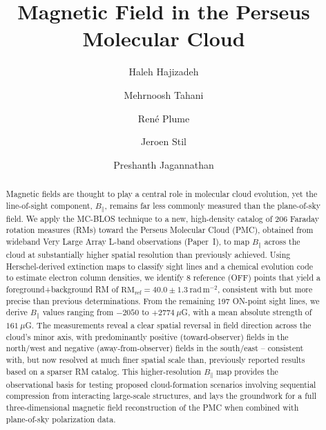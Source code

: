 \documentclass[twocolumn]{aastex631}
\begin{document}
\title{Magnetic Field in the Perseus Molecular Cloud}


\author{Haleh Hajizadeh}


\author{Mehrnoosh Tahani}

\author{René Plume}

\author{Jeroen Stil}



\author{Preshanth Jagannathan}


\begin{abstract}


Magnetic fields are thought to play a central role in molecular cloud evolution, yet the line-of-sight component, $B_\parallel$, remains far less commonly measured than the plane-of-sky field. We apply the MC-BLOS technique to a new, high-density catalog of 206 Faraday rotation measures (RMs) toward the Perseus Molecular Cloud (PMC), obtained from wideband Very Large Array L-band observations (Paper~I), to map $B_\parallel$ across the cloud at substantially higher spatial resolution than previously achieved. Using Herschel-derived extinction maps to classify sight lines and a chemical evolution code to estimate electron column densities, we identify 8 reference (OFF) points that yield a foreground+background RM of $\mathrm{RM_{ref}} = 40.0 \pm 1.3~\mathrm{rad\,m^{-2}}$, consistent with but more precise than previous determinations. From the remaining 197 ON-point sight lines, we derive $B_\parallel$ values ranging from $-2050$ to $+2774~\mu$G, with a mean absolute strength of $161~\mu$G. The measurements reveal a clear spatial reversal in field direction across the cloud's minor axis, with predominantly positive (toward-observer) fields in the north/west and negative (away-from-observer) fields in the south/east -- consistent with, but now resolved at much finer spatial scale than, previously reported results based on a sparser RM catalog. This higher-resolution $B_\parallel$ map provides the observational basis for testing proposed cloud-formation scenarios involving sequential compression from interacting large-scale structures, and lays the groundwork for a full three-dimensional magnetic field reconstruction of the PMC when combined with plane-of-sky polarization data.

\end{abstract}
\end{document}
